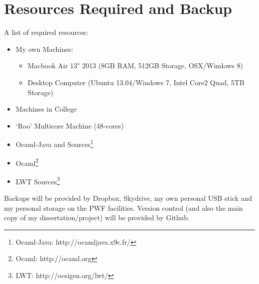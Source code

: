 \documentclass[a4paper]{article}
\begin{document}
\section{Resources Required and Backup}
\label{sec:resources}
A list of required resources:
\begin{itemize}
\item{My own Machines:
    \begin{itemize}
    \item{Macbook Air 13" 2013 (8GB RAM, 512GB Storage, OSX/Windows 8)}
    \item{Desktop Computer (Ubuntu 13.04/Windows 7, Intel Core2 Quad, 5TB Storage)}
    \end{itemize}
}
\item{Machines in College}
\item{`Roo' Multicore Machine (48-cores)}
\item{Ocaml-Java and Sources\footnote{Ocaml-Java: http://ocamljava.x9c.fr/}}
\item{Ocaml\footnote{Ocaml: http://ocaml.org}}
\item{LWT Sources\footnote{LWT: http://ocsigen.org/lwt/}}
\end{itemize}

Backups will be provided by Dropbox, Skydrive, my own personal USB stick and my personal storage on the PWF facilities.
Version control (and also the main copy of my dissertation/project) will be provided by Github.
\end{document}
